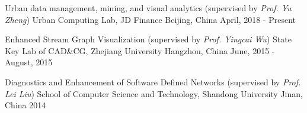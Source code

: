 

\begin{cventries}

  \cventry
    {Urban data management, mining, and visual analytics (supervised by \textit{Prof. Yu Zheng})} %
    {Urban Computing Lab, JD Finance} %
    {Beijing, China} %
    {April, 2018 - Present} %
    {}
  \vspace{-4mm}

  \cventry
    {Enhanced Stream Graph Visualization (supervised by \textit{Prof. Yingcai Wu})} %
    {State Key Lab of CAD\&CG, Zhejiang University} %
    {Hangzhou, China} %
    {June, 2015 - August, 2015} %
    {}
  \vspace{-4mm}

  \cventry
    {Diagnostics and Enhancement of Software Defined Networks (supervised by \textit{Prof. Lei Liu})}
    {School of Computer Science and Technology, Shandong University}
    {Jinan, China}
    {2014}
    {}

\end{cventries}
\vspace{-5mm}
